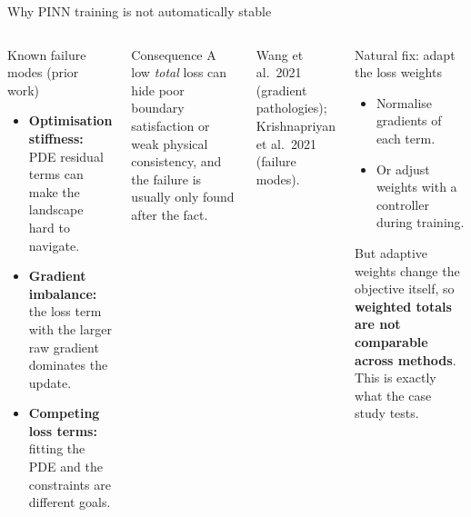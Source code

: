 \documentclass[aspectratio=169,10pt]{beamer}
\newcommand{\smallnote}[1]{{\scriptsize\color{midgray}#1}}
\begin{document}
\begin{frame}{Why PINN training is not automatically stable}
\begin{columns}[T,onlytextwidth]
\begin{block}{Known failure modes (prior work)}
\begin{itemize}\footnotesize
  \item \textbf{Optimisation stiffness:} PDE residual terms can make the landscape hard to navigate.
  \item \textbf{Gradient imbalance:} the loss term with the larger raw gradient dominates the update.
  \item \textbf{Competing loss terms:} fitting the PDE and the constraints are different goals.
\end{itemize}
\end{block}
\begin{alertblock}{Consequence}
\footnotesize A low \emph{total} loss can hide poor boundary satisfaction or weak physical consistency, and the failure is usually only found after the fact.
\end{alertblock}
\smallnote{Wang et al.\ 2021 (gradient pathologies); Krishnapriyan et al.\ 2021 (failure modes).}
\begin{exampleblock}{Natural fix: adapt the loss weights}
\small
\begin{itemize}
  \item Normalise gradients of each term.
  \item Or adjust weights with a controller during training.
\end{itemize}
\vspace{2pt}
But adaptive weights change the objective itself, so \textbf{weighted totals are not comparable across methods}. This is exactly what the case study tests.
\end{exampleblock}
\end{columns}
\end{frame}
\end{document}

